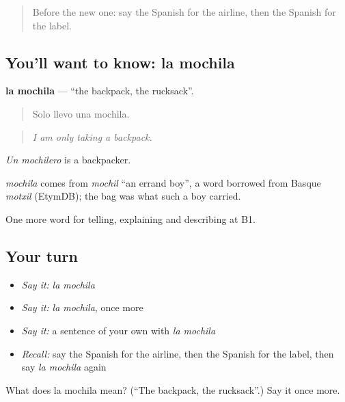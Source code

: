 \label{lesson:ES-C652-mochila}



\begin{quote}
Before the new one: say the Spanish for the airline, then the Spanish for the label.
\end{quote}

\subsection*{You'll want to know: la mochila}
\textbf{la mochila} — \textquotedblleft{}the backpack, the rucksack\textquotedblright{}.

\begin{quote}
Solo llevo una mochila.
\end{quote}

\begin{quote}
\emph{I am only taking a backpack.}
\end{quote}

\emph{Un mochilero} is a backpacker.

\begin{cousinweb}
\emph{mochila} comes from \emph{mochil} \textquotedblleft{}an errand boy\textquotedblright{}, a word borrowed from Basque \emph{motxil} (EtymDB); the bag was what such a boy carried.
\end{cousinweb}

\begin{grammarlens}[title={What you've built}]
One more word for telling, explaining and describing at B1.
\end{grammarlens}

\subsection*{Your turn}
\begin{itemize}
\raggedright
  \item \emph{Say it:} \emph{la mochila}
  \item \emph{Say it:} \emph{la mochila}, once more
  \item \emph{Say it:} a sentence of your own with \emph{la mochila}
  \item \emph{Recall:} say the Spanish for the airline, then the Spanish for the label, then say \emph{la mochila} again
\end{itemize}

\begin{tcolorbox}[breakable,colback=teal!4,colframe=teal!35!black,title={Before you move on}]
What does la mochila mean? (\textquotedblleft{}The backpack, the rucksack\textquotedblright{}.) Say it once more.
\end{tcolorbox}
